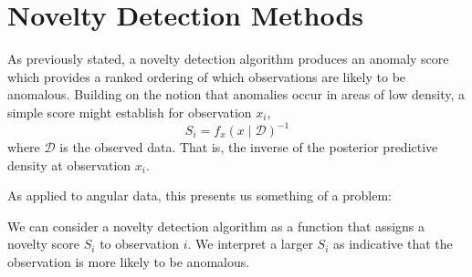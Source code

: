 \section{Novelty Detection Methods\label{sec:novelty}}
As previously stated, a novelty detection algorithm produces an anomaly score which
    provides a ranked ordering of which observations are likely to be anomalous.
    Building on the notion that anomalies occur in areas of low density, a simple
    score might establish for observation $x_i$, \[S_i = f_{x}(x\mid\mathcal{D})^{-1}\]
    where $\mathcal{D}$ is the observed data.  That is, the inverse of the posterior
    predictive density at observation $x_i$.  
    
    
    
    
    
    As applied to angular data, this presents
    us something of a problem:  





We can consider a novelty detection algorithm as a function that assigns a
  novelty score $S_i$ to observation $i$.  We interpret a larger $S_i$
  as indicative that the observation is more likely to be anomalous.

